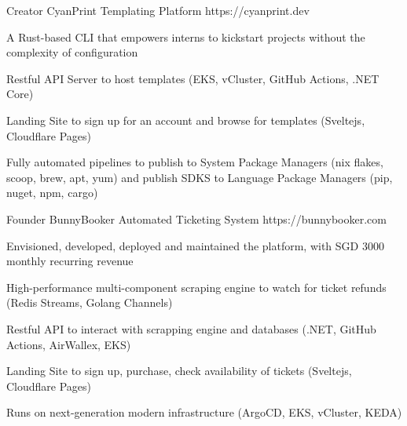 

\begin{cventries}
    \cventry
    {Creator} %
    {CyanPrint} %
    {Templating Platform} %
    {https://cyanprint.dev} %
    {
    \begin{cvitems} %
        \item {A Rust-based CLI that empowers interns to kickstart projects without the complexity of configuration}
        \item {Restful API Server to host templates (EKS, vCluster, GitHub Actions, .NET Core)}
        \item {Landing Site to sign up for an account and browse for templates (Sveltejs, Cloudflare Pages)}
        \item {Fully automated pipelines to publish to System Package Managers (nix flakes, scoop, brew, apt, yum) \newline
                and publish SDKS to Language Package Managers (pip, nuget, npm, cargo)}
    \end{cvitems}
    }
    \cventry
    {Founder} %
    {BunnyBooker} %
    {Automated Ticketing System} %
    {https://bunnybooker.com} %
    {
    \begin{cvitems} %
        \item {Envisioned, developed, deployed and maintained the platform, with SGD 3000 monthly recurring revenue}
        \item {High-performance multi-component scraping engine to watch for ticket refunds (Redis Streams, Golang Channels)}
        \item {Restful API to interact with scrapping engine and databases (.NET, GitHub Actions, AirWallex, EKS)}
        \item {Landing Site to sign up, purchase, check availability of tickets (Sveltejs, Cloudflare Pages)}
        \item {Runs on next-generation modern infrastructure (ArgoCD, EKS, vCluster, KEDA)}
    \end{cvitems}
    }
\end{cventries}
